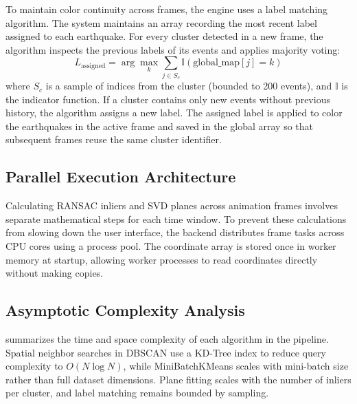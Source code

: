 To maintain color continuity across frames, the engine uses a label matching algorithm. The system maintains an array recording the most recent label assigned to each earthquake. For every cluster detected in a new frame, the algorithm inspects the previous labels of its events and applies majority voting:
\begin{equation}
    L_\text{assigned} = \arg\max_k \sum_{j \in S_c} \mathbb{I}(\text{global\_map}[j] = k)
    \label{eq:majority-voting}
\end{equation}
where $S_c$ is a sample of indices from the cluster (bounded to 200 events), and $\mathbb{I}$ is the indicator function. If a cluster contains only new events without previous history, the algorithm assigns a new label. The assigned label is applied to color the earthquakes in the active frame and saved in the global array so that subsequent frames reuse the same cluster identifier.

\subsection{Parallel Execution Architecture}

Calculating RANSAC inliers and SVD planes across animation frames involves separate mathematical steps for each time window. To prevent these calculations from slowing down the user interface, the backend distributes frame tasks across CPU cores using a process pool. The coordinate array is stored once in worker memory at startup, allowing worker processes to read coordinates directly without making copies.

\subsection{Asymptotic Complexity Analysis}

 summarizes the time and space complexity of each algorithm in the pipeline. Spatial neighbor searches in DBSCAN use a KD-Tree index to reduce query complexity to $O(N \log N)$, while MiniBatchKMeans scales with mini-batch size rather than full dataset dimensions. Plane fitting scales with the number of inliers per cluster, and label matching remains bounded by sampling.

